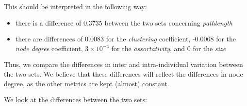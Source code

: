 \documentclass[
]{article}
\providecommand{\tightlist}{%
  \setlength{\itemsep}{0pt}\setlength{\parskip}{0pt}}
\begin{document}
This should be interpreted in the following way:

\begin{itemize}
\tightlist
\item
  there is a difference of 0.3735 between the two sets concerning
  \emph{pathlength}
\item
  there are differences of 0.0083 for the \emph{clustering} coefficient,
  -0.0068 for the \emph{node degree} coefficient,
  \ensuremath{3\times 10^{-4}} for the \emph{assortativity}, and 0 for
  the \emph{size}
\end{itemize}

Thus, we compare the differences in inter and intra-individual variation
between the two sets. We believe that these differences will reflect the
differences in node degree, as the other metrics are kept (almost)
constant.

We look at the differences between the two sets:
\end{document}
